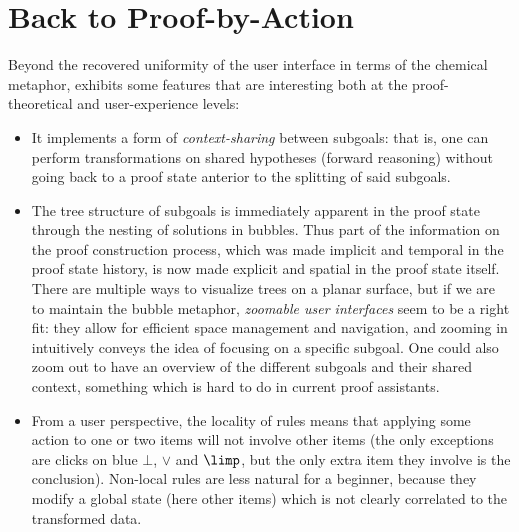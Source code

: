 \section{Back to Proof-by-Action}


Beyond the recovered uniformity of the user interface in terms of the chemical
metaphor,  exhibits some features that are interesting both at the
proof-theoretical and user-experience levels:
\begin{itemize}
  \item It implements a form of \emph{context-sharing} between subgoals: that
    is, one can perform transformations on shared hypotheses (forward reasoning)
    without going back to a proof state anterior to the splitting of said
    subgoals.
  \item The tree structure of subgoals is immediately apparent in the proof
    state through the nesting of solutions in bubbles. Thus part of the
    information on the proof construction process, which was made implicit and
    temporal in the proof state history, is now made explicit and spatial in the
    proof state itself. There are multiple ways to visualize trees on a planar
    surface, but if we are to maintain the bubble metaphor, \emph{zoomable user
    interfaces} seem to be a right fit: they allow for efficient space
    management and navigation, and zooming in intuitively conveys the idea of
    focusing on a specific subgoal. One could also zoom out to have an overview
    of the different subgoals and their shared context, something which is hard
    to do in current proof assistants.
  \item From a user perspective, the locality of rules means that applying some
    action to one or two items will not involve other items (the only exceptions
    are clicks on blue $\bot$, $\lor$ and ${\limp}$, but the only extra item
    they involve is the conclusion). Non-local rules are less natural for a
    beginner, because they modify a global state (here other items) which is not
    clearly correlated to the transformed data.
\end{itemize}

